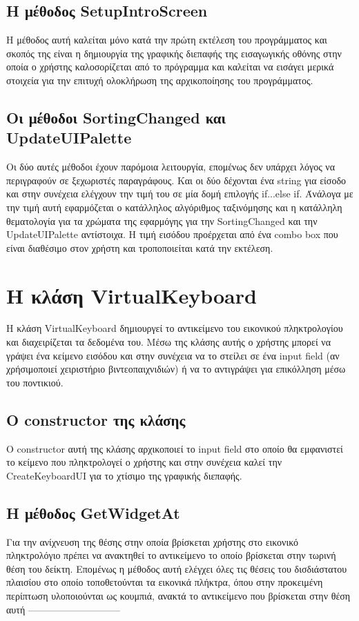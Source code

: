 \subsection{Η μέθοδος SetupIntroScreen}
Η μέθοδος αυτή καλείται μόνο κατά την πρώτη εκτέλεση του προγράμματος και σκοπός της
είναι η δημιουργία της γραφικής διεπαφής της εισαγωγικής οθόνης στην οποία ο χρήστης
καλοσορίζεται από το πρόγραμμα και καλείται να εισάγει μερικά στοιχεία για την επιτυχή
ολοκλήρωση της αρχικοποίησης του προγράμματος. 


\subsection{Οι μέθοδοι SortingChanged και UpdateUIPalette}
Οι δύο αυτές μέθοδοι έχουν παρόμοια λειτουργία, επομένως δεν υπάρχει λόγος να περιγραφούν
σε ξεχωριστές παραγράφους. Και οι δύο δέχονται ένα string για είσοδο και στην συνέχεια
ελέγχουν την τιμή του σε μία δομή επιλογής if...else if. Άνάλογα με την τιμή αυτή εφαρμόζεται
ο κατάλληλος αλγόριθμος ταξινόμησης και η κατάλληλη θεματολογία για τα χρώματα της εφαρμόγης
για την SortingChanged και την UpdateUIPalette αντίστοιχα. Η τιμή εισόδου προέρχεται από
ένα combo box που είναι διαθέσιμο στον χρήστη και τροποποιείται κατά την εκτέλεση.






\section{Η κλάση VirtualKeyboard}

Η κλάση VirtualKeyboard δημιουργεί το αντικείμενο του εικονικού πληκτρολογίου και διαχειρίζεται
τα δεδομένα του. Μέσω της κλάσης αυτής ο χρήστης μπορεί να γράψει ένα κείμενο εισόδου και στην
συνέχεια να το στείλει σε ένα input field (αν χρήσιμοποιεί χειριστήριο βιντεοπαιχνιδιών) ή να 
το αντιγράψει για επικόλληση μέσω του ποντικιού.  


\subsection{Ο constructor της κλάσης}
Ο constructor αυτή της κλάσης αρχικοποιεί το input field στο οποίο θα εμφανιστεί το κείμενο που
πληκτρολογεί ο χρήστης και στην συνέχεια καλεί την CreateKeyboardUI για το χτίσιμο της γραφικής
διεπαφής.


\subsection{Η μέθοδος GetWidgetAt}
Για την ανίχνευση της θέσης στην οποία βρίσκεται χρήστης στο εικονικό πληκτρολόγιο πρέπει να
ανακτηθεί το αντικείμενο το οποίο βρίσκεται στην τωρινή θέση του δείκτη. Επομένως η μέθοδος
αυτή ελέγχει όλες τις θέσεις του δισδιάστατου πλαισίου στο οποίο τοποθετούνται τα εικονικά
πλήκτρα, όπου στην προκειμένη περίπτωση υλοποιούνται ως κουμπιά, ανακτά το αντικείμενο που
βρίσκεται στην θέση αυτή -----------------------------


